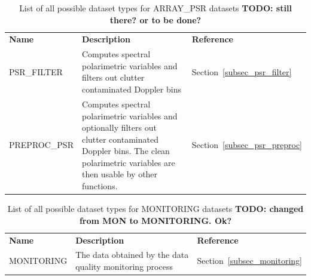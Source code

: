 \documentclass[a4paper,11pt,pdftex,twoside]{scrartcl}
\renewcommand{\bf}{\normalfont \bfseries}
\begin{document}
{{{\begin{table}[H]
\begin{tabularx}{\textwidth}{lXl}
\bf{Name}             & \bf{Description}                                                   & \bf{Reference}\\
PSR\_FILTER           & Computes spectral polarimetric variables and filters out clutter
                        contaminated Doppler bins                                          & Section~\ref{subsec_psr_filter}\\
PREPROC\_PSR          & Computes spectral polarimetric variables and optionally filters
                        out clutter contaminated Doppler bins. The clean polarimetric
                        variables are then usable by other functions.                      & Section~\ref{subsec_psr_preproc}\\
\end{tabularx}
\caption{List of all possible dataset types for ARRAY\_PSR datasets {\bf TODO: still there? or to be done? }                                    }
\label{tab_datasets_ARRAY_PSR}
\end{table}


\begin{table}[H]
\begin{tabularx}{\textwidth}{lXl}
\bf{Name}     & \bf{Description}                                & \bf{Reference}\\

MONITORING & The data obtained by the data quality monitoring process   & Section~\ref{subsec_monitoring}\\
\end{tabularx}
\caption{List of all possible dataset types for MONITORING datasets {\bf TODO: changed from MON to MONITORING. Ok? }                                    }
\label{tab_datasets_MONITORING}
\end{table}

}}}
\end{document}
